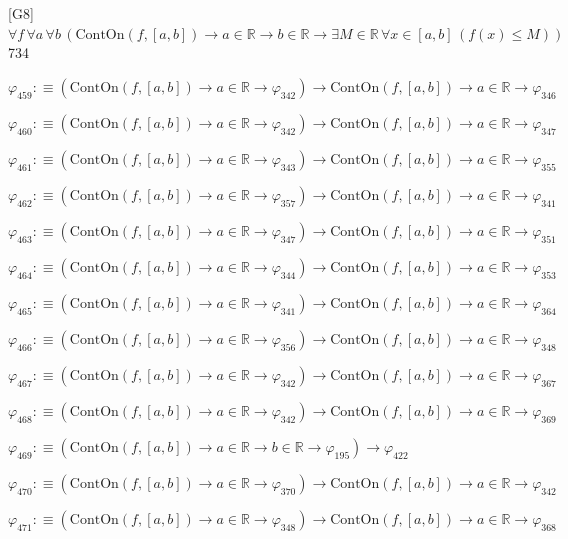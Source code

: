 \begin{fullproof}{[G8]}{$\forall f\,\forall a\,\forall b\,(\mathrm{ContOn}(f,[a,b]) \to a \in \mathbb{R} \to b \in \mathbb{R} \to \exists M \in \mathbb{R}\,\forall x \in [a,b]\,(f(x) \leq M))$}{734}
\begin{abbrevlist}
\item $\varphi_{459} :\equiv (\mathrm{ContOn}(f,[a,b]) \to a \in \mathbb{R} \to \varphi_{342}) \to \mathrm{ContOn}(f,[a,b]) \to a \in \mathbb{R} \to \varphi_{346}$
\item $\varphi_{460} :\equiv (\mathrm{ContOn}(f,[a,b]) \to a \in \mathbb{R} \to \varphi_{342}) \to \mathrm{ContOn}(f,[a,b]) \to a \in \mathbb{R} \to \varphi_{347}$
\item $\varphi_{461} :\equiv (\mathrm{ContOn}(f,[a,b]) \to a \in \mathbb{R} \to \varphi_{343}) \to \mathrm{ContOn}(f,[a,b]) \to a \in \mathbb{R} \to \varphi_{355}$
\item $\varphi_{462} :\equiv (\mathrm{ContOn}(f,[a,b]) \to a \in \mathbb{R} \to \varphi_{357}) \to \mathrm{ContOn}(f,[a,b]) \to a \in \mathbb{R} \to \varphi_{341}$
\item $\varphi_{463} :\equiv (\mathrm{ContOn}(f,[a,b]) \to a \in \mathbb{R} \to \varphi_{347}) \to \mathrm{ContOn}(f,[a,b]) \to a \in \mathbb{R} \to \varphi_{351}$
\item $\varphi_{464} :\equiv (\mathrm{ContOn}(f,[a,b]) \to a \in \mathbb{R} \to \varphi_{344}) \to \mathrm{ContOn}(f,[a,b]) \to a \in \mathbb{R} \to \varphi_{353}$
\item $\varphi_{465} :\equiv (\mathrm{ContOn}(f,[a,b]) \to a \in \mathbb{R} \to \varphi_{341}) \to \mathrm{ContOn}(f,[a,b]) \to a \in \mathbb{R} \to \varphi_{364}$
\item $\varphi_{466} :\equiv (\mathrm{ContOn}(f,[a,b]) \to a \in \mathbb{R} \to \varphi_{356}) \to \mathrm{ContOn}(f,[a,b]) \to a \in \mathbb{R} \to \varphi_{348}$
\item $\varphi_{467} :\equiv (\mathrm{ContOn}(f,[a,b]) \to a \in \mathbb{R} \to \varphi_{342}) \to \mathrm{ContOn}(f,[a,b]) \to a \in \mathbb{R} \to \varphi_{367}$
\item $\varphi_{468} :\equiv (\mathrm{ContOn}(f,[a,b]) \to a \in \mathbb{R} \to \varphi_{342}) \to \mathrm{ContOn}(f,[a,b]) \to a \in \mathbb{R} \to \varphi_{369}$
\item $\varphi_{469} :\equiv (\mathrm{ContOn}(f,[a,b]) \to a \in \mathbb{R} \to b \in \mathbb{R} \to \varphi_{195}) \to \varphi_{422}$
\item $\varphi_{470} :\equiv (\mathrm{ContOn}(f,[a,b]) \to a \in \mathbb{R} \to \varphi_{370}) \to \mathrm{ContOn}(f,[a,b]) \to a \in \mathbb{R} \to \varphi_{342}$
\item $\varphi_{471} :\equiv (\mathrm{ContOn}(f,[a,b]) \to a \in \mathbb{R} \to \varphi_{348}) \to \mathrm{ContOn}(f,[a,b]) \to a \in \mathbb{R} \to \varphi_{368}$

\end{abbrevlist}
\end{fullproof}
